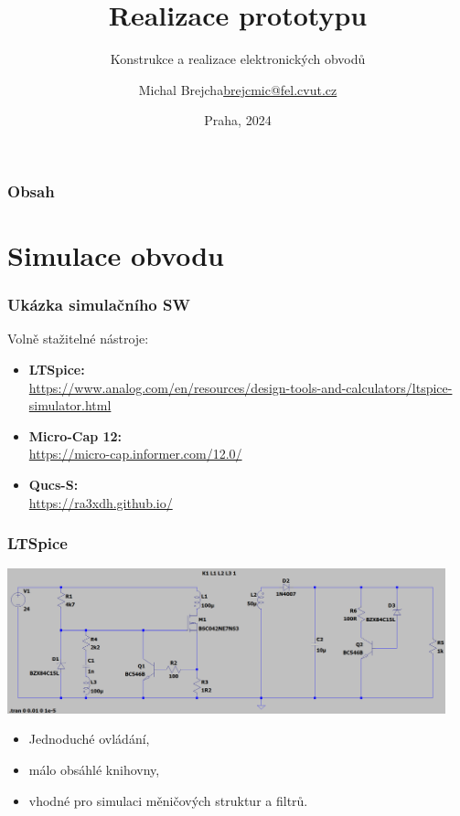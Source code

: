 \documentclass{beamer}
\title[Realizace prototypu]{Realizace prototypu}
\subtitle[KEO] {Konstrukce a realizace elektronických obvodů}
\author[Brejcha]{\texorpdfstring{Michal Brejcha\newline\url{brejcmic@fel.cvut.cz}}{Michal Brejcha}}
\institute[ČVUT]{ČVUT v Praze, FEL}
\date[Praha, 2024]{Praha, 2024}
\begin{document}
\frame{\titlepage}

\begin{frame}
\frametitle{Obsah} 
\tableofcontents
\end{frame}


\section{\texorpdfstring{Simulace obvodu}{Simulace obvodu}}
  \begin{frame}
    \frametitle{Ukázka simulačního SW}
    
		Volně stažitelné nástroje:
		
		\begin{itemize}
			\item \textbf{LTSpice:} \\ \url{https://www.analog.com/en/resources/design-tools-and-calculators/ltspice-simulator.html}
			\item \textbf{Micro-Cap 12:} \\ \url{https://micro-cap.informer.com/12.0/}
			\item \textbf{Qucs-S:} \\ \url{https://ra3xdh.github.io/}
		\end{itemize}
    
  \end{frame}
  \begin{frame}
    \frametitle{LTSpice}
    
		\begin{center}
			\includegraphics[width=0.95\textwidth]{obr/LTSpice.png} 
		\end{center}
		
		
		\begin{itemize}
			\item Jednoduché ovládání,
			\item málo obsáhlé knihovny,
			\item vhodné pro simulaci měničových struktur a filtrů.
		\end{itemize}
    
  \end{frame}
\end{document}
